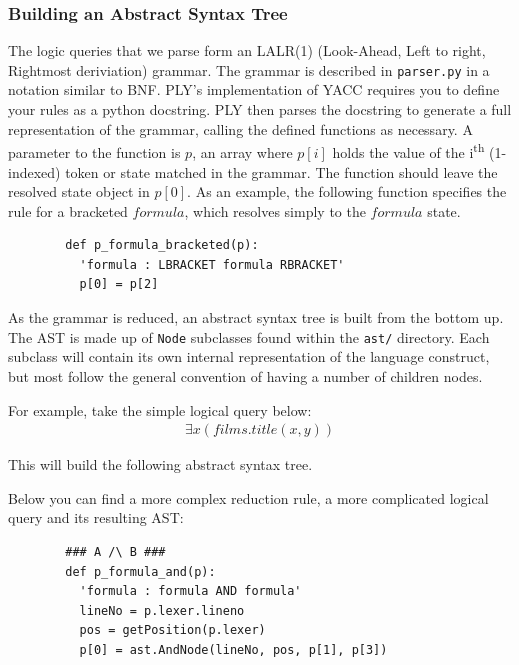 \documentclass[a4paper, 11pt]{article}
\begin{document}

      \subsubsection{Building an Abstract Syntax Tree}

      The logic queries that we parse form an LALR(1) (Look-Ahead, Left to
      right, Rightmost deriviation) grammar\cite{sittingacrossthere}. The
      grammar is described in \texttt{parser.py} in a notation similar to BNF.
      PLY's implementation of YACC requires you to define your rules as a
      python docstring. PLY then parses the docstring to generate a full
      representation of the grammar, calling the defined functions as
      necessary. A parameter to the function is $p$, an array where $p[i]$
      holds the value of the i\textsuperscript{th} (1-indexed) token or state matched in the
      grammar. The function should leave the resolved state object in $p[0]$.
      As an example, the following function specifies the rule for a bracketed
      $formula$, which resolves simply to the $formula$ state. 
      \begin{verbatim}
        def p_formula_bracketed(p):
          'formula : LBRACKET formula RBRACKET'
          p[0] = p[2]
      \end{verbatim}

      As the grammar is reduced, an abstract syntax tree is built from the
      bottom up. The AST is made up of \texttt{Node} subclasses found within
      the \texttt{ast/}
      directory. Each subclass will contain its own internal representation of
      the language construct, but most follow the general convention of having
      a number of children nodes.

      For example, take the simple logical query below:
      \begin{gather}
        \exists x(films.title(x, y))
      \end{gather}

      This will build the following abstract syntax tree.


      Below you can find a more complex reduction rule, a more complicated
      logical query and its resulting AST:

      \begin{verbatim}
        ### A /\ B ###
        def p_formula_and(p):
          'formula : formula AND formula'
          lineNo = p.lexer.lineno
          pos = getPosition(p.lexer)
          p[0] = ast.AndNode(lineNo, pos, p[1], p[3])
      \end{verbatim}
\end{document}
